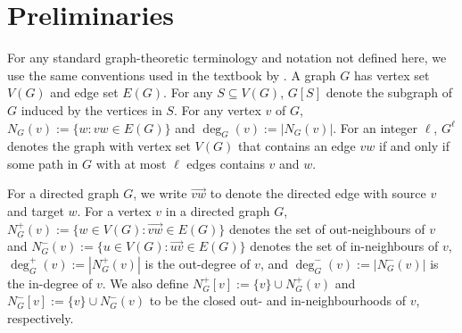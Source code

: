 \documentclass{patmorin}
\begin{document}





\section{Preliminaries}

For any standard graph-theoretic terminology and notation not defined here, we use the same conventions used in the textbook by \citet{diestel:graph}.  A graph $G$ has vertex set $V(G)$ and edge set $E(G)$.  For any $S\subseteq V(G)$, $G[S]$ denote the subgraph of $G$ induced by the vertices in $S$.  For any vertex $v$ of $G$, $N_G(v):=\{w:vw\in E(G)\}$ and $\deg_G(v):=|N_G(v)|$.  For an integer $\ell$, $G^\ell$ denotes the graph with vertex set $V(G)$ that contains an edge $vw$ if and only if some path in $G$ with at most $\ell$ edges contains $v$ and $w$.

For a directed graph $G$, we write $\overrightarrow{vw}$ to denote the directed edge with source $v$ and target $w$.  For a vertex $v$ in a directed graph $G$, $N^+_{G}(v):=\{w\in V(G):\overrightarrow{vw}\in E(G)\}$ denotes the set of out-neighbours of $v$ and $N^-_G(v):=\{u\in V(G):\overrightarrow{uv}\in E(G)\}$ denotes the set of in-neighbours of $v$, $\deg^+_{G}(v):=|N^+_G(v)|$ is the out-degree of $v$, and $\deg^-_{G}(v):=|N^-_G(v)|$ is the in-degree of $v$. We also define $N^+_{G}[v]:=\{v\}\cup N^+_{G}(v)$ and $N^-_{G}[v]:=\{v\}\cup N^-_{G}(v)$ to be the closed out- and in-neighbourhoods of $v$, respectively.
\end{document}
